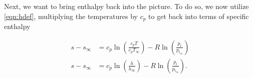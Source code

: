 
%
Next, we want to bring enthalpy back into the picture.
%
To do so, we now utilize \cref{eqn:hdef}, multiplying the temperatures by \(c_p\) to get back into terms of specific enthalpy


\begin{equation}
    \label{eqn:entropy1}
    \begin{aligned}
        s-s_\infty &= c_p \ln\left(\frac{c_pT}{c_pT_\infty}\right) - R \ln\left(\frac{p_t}{p_{t_\infty}}\right)\\
        s-s_\infty &= c_p \ln\left(\frac{h}{h_\infty}\right) - R \ln\left(\frac{p_t}{p_{t_\infty}}\right).
    \end{aligned}
\end{equation}

